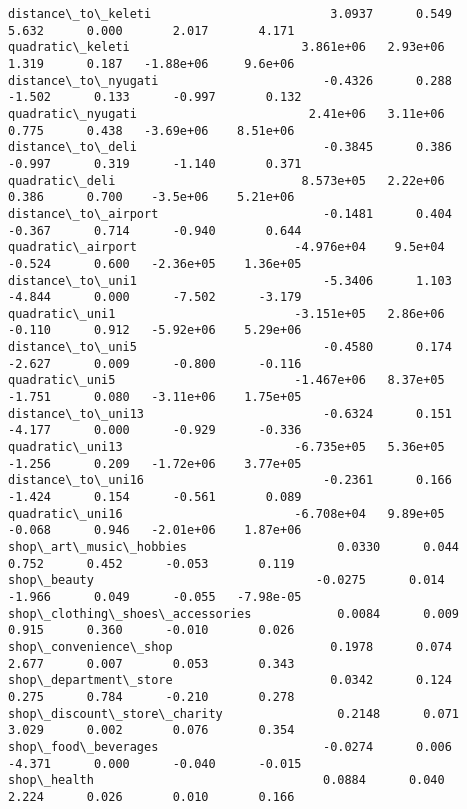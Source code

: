 \documentclass[11pt]{article}
\begin{document}
\begin{Verbatim}[commandchars=\\\{\}]
distance\_to\_keleti                         3.0937      0.549      5.632      0.000       2.017       4.171
quadratic\_keleti                        3.861e+06   2.93e+06      1.319      0.187   -1.88e+06     9.6e+06
distance\_to\_nyugati                       -0.4326      0.288     -1.502      0.133      -0.997       0.132
quadratic\_nyugati                        2.41e+06   3.11e+06      0.775      0.438   -3.69e+06    8.51e+06
distance\_to\_deli                          -0.3845      0.386     -0.997      0.319      -1.140       0.371
quadratic\_deli                          8.573e+05   2.22e+06      0.386      0.700    -3.5e+06    5.21e+06
distance\_to\_airport                       -0.1481      0.404     -0.367      0.714      -0.940       0.644
quadratic\_airport                      -4.976e+04    9.5e+04     -0.524      0.600   -2.36e+05    1.36e+05
distance\_to\_uni1                          -5.3406      1.103     -4.844      0.000      -7.502      -3.179
quadratic\_uni1                         -3.151e+05   2.86e+06     -0.110      0.912   -5.92e+06    5.29e+06
distance\_to\_uni5                          -0.4580      0.174     -2.627      0.009      -0.800      -0.116
quadratic\_uni5                         -1.467e+06   8.37e+05     -1.751      0.080   -3.11e+06    1.75e+05
distance\_to\_uni13                         -0.6324      0.151     -4.177      0.000      -0.929      -0.336
quadratic\_uni13                        -6.735e+05   5.36e+05     -1.256      0.209   -1.72e+06    3.77e+05
distance\_to\_uni16                         -0.2361      0.166     -1.424      0.154      -0.561       0.089
quadratic\_uni16                        -6.708e+04   9.89e+05     -0.068      0.946   -2.01e+06    1.87e+06
shop\_art\_music\_hobbies                     0.0330      0.044      0.752      0.452      -0.053       0.119
shop\_beauty                               -0.0275      0.014     -1.966      0.049      -0.055   -7.98e-05
shop\_clothing\_shoes\_accessories            0.0084      0.009      0.915      0.360      -0.010       0.026
shop\_convenience\_shop                      0.1978      0.074      2.677      0.007       0.053       0.343
shop\_department\_store                      0.0342      0.124      0.275      0.784      -0.210       0.278
shop\_discount\_store\_charity                0.2148      0.071      3.029      0.002       0.076       0.354
shop\_food\_beverages                       -0.0274      0.006     -4.371      0.000      -0.040      -0.015
shop\_health                                0.0884      0.040      2.224      0.026       0.010       0.166

\end{Verbatim}
\end{document}
